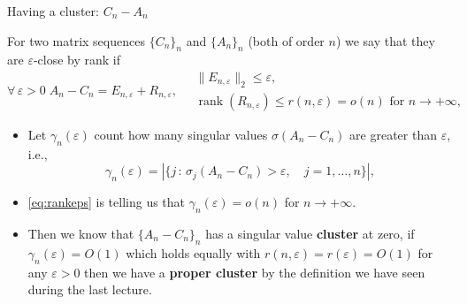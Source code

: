 \documentclass[aspectratio=169,xcolor=dvipsnames]{beamer}
\begin{document}
\begin{frame}{Having a cluster: $C_n - A_n$}
	
	For two matrix sequences $\{C_n\}_n$ and $\{A_n\}_{n}$ (both of order $n$) we say that they are \alert{$\varepsilon$-close} by rank if
	\begin{equation}\tag{$\varepsilon$-close}\label{eq:rankeps}
		\forall\,\varepsilon > 0 \; A_n - C_n = E_{n,\varepsilon} + R_{n,\varepsilon}, \quad \begin{array}{l}\|E_{n,\varepsilon}\|_2 \leq \varepsilon, \\ \operatorname{rank}(R_{n,\varepsilon}) \leq r(n,\varepsilon) = o(n) \text{ for } n \rightarrow +\infty,\end{array}
	\end{equation}
	\begin{itemize}
		\item[\faCogs]<2-> Let $\gamma_n(\varepsilon)$ count how many singular values $\sigma(A_n - C_n)$ are greater than $\varepsilon$, i.e.,
		\[
		\gamma_n(\varepsilon) = \left\lvert\{ j \,:\, \sigma_j(A_n - C_n) > \varepsilon, \quad j=1,\ldots,n \}\right\rvert,
		\]
		\item[$\Rightarrow$]<3-> \eqref{eq:rankeps} is telling us that $\gamma_n(\varepsilon) = o(n)$ for $n \rightarrow + \infty$.
		\item[\faLightbulb]<4-> Then we know that $\{A_n - C_n\}_n$ has a singular value \textbf{cluster} at zero, if $\gamma_n(\varepsilon) = O(1)$ which holds equally with $r(n,\varepsilon) = r(\varepsilon) = O(1)$ for any $\varepsilon > 0$ then we have a \textbf{proper cluster} by the definition we have seen during the last lecture. 
	\end{itemize}
	
\end{frame}
\end{document}
